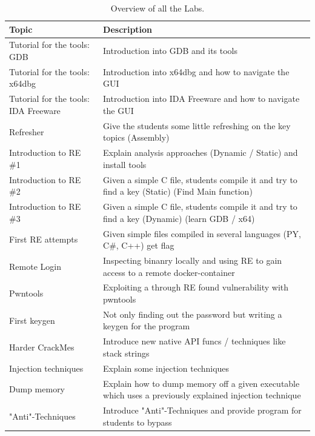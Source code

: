 \begin{center}
    \begin{table}[H]
        \centering
        \begin{tabular}{ |p{4.1cm}|p{10cm}| } 
            \hline
                Topic & 
                Description \\ [0.5ex] 
            \hline
            \hline
                Tutorial for the tools: GDB & Introduction into GDB and its tools \\
            \hline
                Tutorial for the tools: x64dbg & Introduction into x64dbg and how to navigate the GUI \\
            \hline
                Tutorial for the tools: IDA Freeware & Introduction into IDA Freeware and how to navigate the GUI \\
            \hline
                Refresher & 
                Give the students some little refreshing on the key topics (Assembly)  \\ 
            \hline
                Introduction to RE \#1 & 
                Explain analysis approaches (Dynamic / Static) and install tools \\ 
            \hline
                Introduction to RE \#2 & 
                Given a simple C file, students compile it and try to find a key (Static) (Find Main function) \\ 
            \hline
                Introduction to RE \#3 & 
                Given a simple C file, students compile it and try to find a key (Dynamic) (learn GDB / x64) \\ 
            \hline
                First RE attempts & 
                Given simple files compiled in several languages (PY, C\#, C++) get flag \\ 
            \hline
                Remote Login  & 
                Inspecting binanry locally and using RE to gain access to a remote docker-container \\
            \hline
                Pwntools & 
                Exploiting a through RE found vulnerability with pwntools \\
            \hline
                First keygen & 
                Not only finding out the password but writing a keygen for the program \\
            \hline
                Harder CrackMes & 
                Introduce new native API funcs / techniques like stack strings \\
            \hline
                Injection techniques & 
                Explain some injection techniques \\
            \hline
                Dump memory & 
                Explain how to dump memory off a given executable which uses a previously explained injection technique \\
            \hline
                "Anti"-Techniques & 
                Introduce "Anti"-Techniques and provide program for students to bypass \\
            \hline
        \end{tabular}
        \caption{Overview of all the Labs.}
    \end{table}
\end{center}
